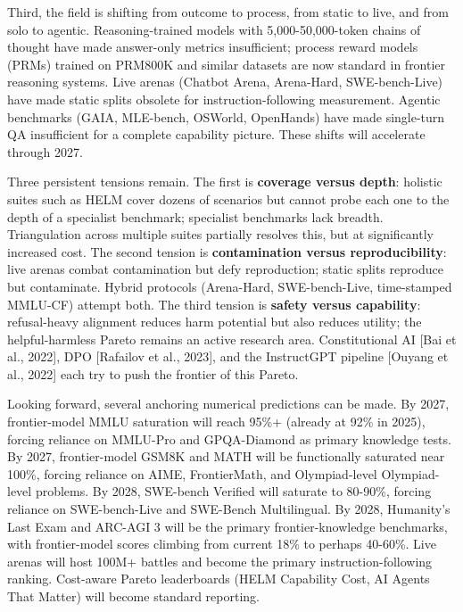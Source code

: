 Third, the field is shifting from outcome to process, from static to live, and from solo to agentic. Reasoning-trained models with 5,000-50,000-token chains of thought have made answer-only metrics insufficient; process reward models (PRMs) trained on PRM800K and similar datasets are now standard in frontier reasoning systems. Live arenas (Chatbot Arena, Arena-Hard, SWE-bench-Live) have made static splits obsolete for instruction-following measurement. Agentic benchmarks (GAIA, MLE-bench, OSWorld, OpenHands) have made single-turn QA insufficient for a complete capability picture. These shifts will accelerate through 2027.

Three persistent tensions remain. The first is \textbf{coverage versus depth}: holistic suites such as HELM cover dozens of scenarios but cannot probe each one to the depth of a specialist benchmark; specialist benchmarks lack breadth. Triangulation across multiple suites partially resolves this, but at significantly increased cost. The second tension is \textbf{contamination versus reproducibility}: live arenas combat contamination but defy reproduction; static splits reproduce but contaminate. Hybrid protocols (Arena-Hard, SWE-bench-Live, time-stamped MMLU-CF) attempt both. The third tension is \textbf{safety versus capability}: refusal-heavy alignment reduces harm potential but also reduces utility; the helpful-harmless Pareto remains an active research area. Constitutional AI {[}Bai et al., 2022{]}, DPO {[}Rafailov et al., 2023{]}, and the InstructGPT pipeline {[}Ouyang et al., 2022{]} each try to push the frontier of this Pareto.

Looking forward, several anchoring numerical predictions can be made. By 2027, frontier-model MMLU saturation will reach 95\%+ (already at 92\% in 2025), forcing reliance on MMLU-Pro and GPQA-Diamond as primary knowledge tests. By 2027, frontier-model GSM8K and MATH will be functionally saturated near 100\%, forcing reliance on AIME, FrontierMath, and Olympiad-level Olympiad-level problems. By 2028, SWE-bench Verified will saturate to 80-90\%, forcing reliance on SWE-bench-Live and SWE-Bench Multilingual. By 2028, Humanity's Last Exam and ARC-AGI 3 will be the primary frontier-knowledge benchmarks, with frontier-model scores climbing from current 18\% to perhaps 40-60\%. Live arenas will host 100M+ battles and become the primary instruction-following ranking. Cost-aware Pareto leaderboards (HELM Capability Cost, AI Agents That Matter) will become standard reporting.

